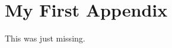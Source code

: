 \documentclass[german,bachelor]{swsLeipzig}
\begin{document}

\appendix
\chapter{My First Appendix}
This was just missing.

\end{document}
